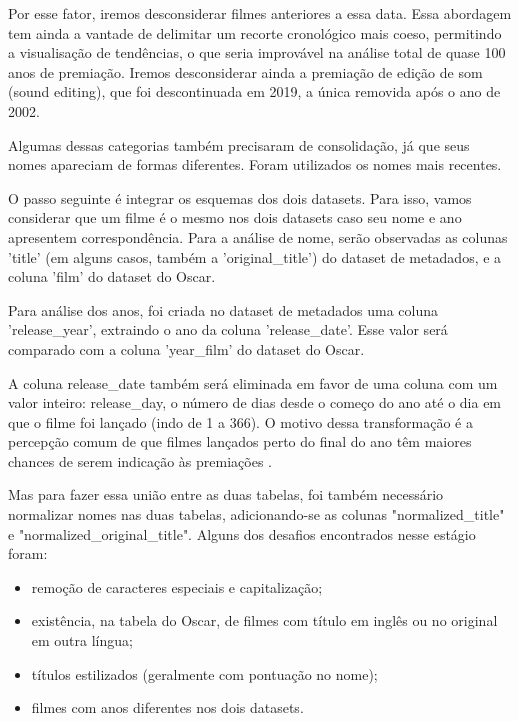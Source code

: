         Por esse fator, iremos desconsiderar filmes anteriores a essa data. Essa abordagem tem ainda a vantade de delimitar um recorte cronológico mais coeso, permitindo a visualisação de tendências, o que seria improvável na análise total de quase 100 anos de premiação. Iremos desconsiderar ainda a premiação de edição de som (sound editing), que foi descontinuada em 2019, a única removida após o ano de 2002.\cite{deadline2020}

        Algumas dessas categorias também precisaram de consolidação, já que seus nomes apareciam de formas diferentes. Foram utilizados os nomes mais recentes.

        O passo seguinte é integrar os esquemas dos dois datasets. Para isso, vamos considerar que um filme é o mesmo nos dois datasets caso seu nome e ano apresentem correspondência. Para a análise de nome, serão observadas as colunas 'title' (em alguns casos, também a 'original\_title') do dataset de metadados, e a coluna 'film' do dataset do Oscar. 

        Para análise dos anos, foi criada no dataset de metadados uma coluna 'release\_year', extraindo o ano da coluna 'release\_date'. Esse valor será comparado com a coluna 'year\_film' do dataset do Oscar.
        
        A coluna release\_date também será eliminada em favor de uma coluna com um valor inteiro: release\_day, o número de dias desde o começo do ano até o dia em que o filme foi lançado (indo de 1 a 366). O motivo dessa transformação é a percepção comum de que filmes lançados perto do final do ano têm maiores chances de serem indicação às premiações \cite{hdsr2020}. 

        Mas para fazer essa união entre as duas tabelas, foi também necessário normalizar nomes nas duas tabelas, adicionando-se as colunas "normalized\_title" e "normalized\_original\_title". Alguns dos desafios encontrados nesse estágio foram:

        \begin{itemize}
            \item remoção de caracteres especiais e capitalização;
            \item existência, na tabela do Oscar, de filmes com título em inglês ou no original em outra língua;
            \item títulos estilizados (geralmente com pontuação no nome);
            \item filmes com anos diferentes nos dois datasets.
        \end{itemize}

